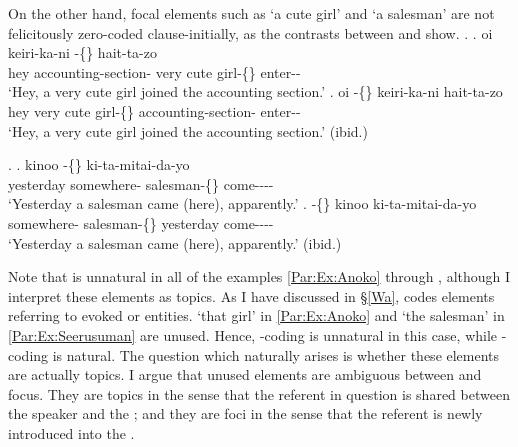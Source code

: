 On the other hand, focal elements such as  `a cute girl' and  `a salesman' are not felicitously zero-coded clause-initially, as the contrasts between \Next[a--b] and \NNext[a--b] show.
%
\ex.
 \ag. oi keiri-ka-ni   -\{\} hait-ta-zo \\
      hey accounting-section- very cute girl-\{\} enter--\\
      `Hey, a very cute girl joined the accounting section.'
 \bg. oi   -\{\} keiri-ka-ni hait-ta-zo \\
      hey very cute girl-\{\} accounting-section- enter--\\
      `Hey, a very cute girl joined the accounting section.'
      \hfill{(ibid.)}

\ex.
 \ag. kinoo  -\{\} ki-ta-mitai-da-yo \\
      yesterday somewhere- salesman-\{\} come---- \\
      `Yesterday a salesman came (here), apparently.'
 \bg.  -\{\} kinoo ki-ta-mitai-da-yo \\
      somewhere- salesman-\{\} yesterday come---- \\
      `Yesterday a salesman came (here), apparently.'
      \hfill{(ibid.)}

Note that  is unnatural in all of the examples \ref{Par:Ex:Anoko} through \Last , 
although I interpret these elements as topics.
As I have discussed in \S \ref{Wa},
 codes elements referring to evoked or  entities.
 `that girl' in \ref{Par:Ex:Anoko} and  `the salesman' in \ref{Par:Ex:Seerusuman} are unused.
Hence, -coding is unnatural in this case, while -coding is natural.
The question which naturally arises is whether these elements are actually topics.
I argue that unused elements are ambiguous between  and focus.
They are topics in the sense that the referent in question is shared between the speaker and the  ;
and they are foci in the sense that the referent is newly introduced into the .

